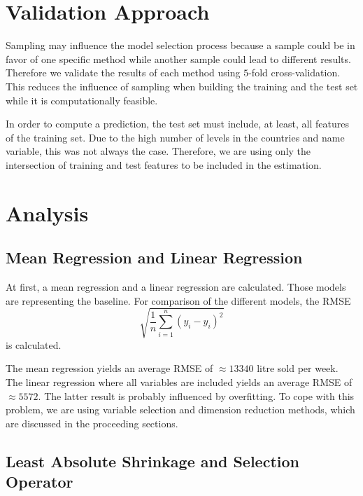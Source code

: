 \documentclass[11pt,]{article}
\begin{document}
\hypertarget{validation-approach}{%
\section{\texorpdfstring{Validation Approach
\label{chap:val}}{Validation Approach }}\label{validation-approach}}

Sampling may influence the model selection process because a sample
could be in favor of one specific method while another sample could lead
to different results. Therefore we validate the results of each method
using \(5\)-fold cross-validation. This reduces the influence of
sampling when building the training and the test set while it is
computationally feasible.

In order to compute a prediction, the test set must include, at least,
all features of the training set. Due to the high number of levels in
the countries and name variable, this was not always the case.
Therefore, we are using only the intersection of training and test
features to be included in the estimation.

\hypertarget{analysis}{%
\section{\texorpdfstring{Analysis
\label{chap:anal}}{Analysis }}\label{analysis}}

\hypertarget{mean-regression-and-linear-regression}{%
\subsection{Mean Regression and Linear
Regression}\label{mean-regression-and-linear-regression}}

At first, a mean regression and a linear regression are calculated.
Those models are representing the baseline. For comparison of the
different models, the \ac{RMSE}
\[\sqrt{\frac{1}{n}\sum_{i = 1}^{n}\left(y_i-\hat{y}_i\right)^2}\] is
calculated.

The mean regression yields an average \ac{RMSE} of \(\approx 13340\)
litre sold per week. The linear regression where all variables are
included yields an average \ac{RMSE} of \(\approx 5572\). The latter
result is probably influenced by overfitting. To cope with this problem,
we are using variable selection and dimension reduction methods, which
are discussed in the proceeding sections.

\hypertarget{least-absolute-shrinkage-and-selection-operator}{%
\subsection{Least Absolute Shrinkage and Selection
Operator}\label{least-absolute-shrinkage-and-selection-operator}}
\end{document}
